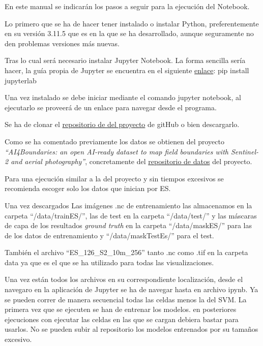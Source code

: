 En este manual se indicarán los pasos a seguir para la ejecución del Notebook.

Lo primero que se ha de hacer tener instalado o instalar Python, preferentemente en su versión 3.11.5 que es en la que se ha desarrollado, aunque seguramente no den problemas versiones más nuevas.

Tras lo cual será necesario instalar Jupyter Notebook. La forma sencilla sería hacer, la guía propia de Jupyter se encuentra en el siguiente \href{https://jupyter.org/install}{enlace}:
pip install jupyterlab

Una vez instalado se debe iniciar mediante el comando jupyter notebook, al ejecutarlo se proveerá de un enlace para navegar desde el programa. 

Se ha de clonar el \href{https://github.com/wgm1001/Trabajo_fin_master_deteccion_bordes}{repositorio de del proyecto} de gitHub o bien descargarlo.

Como se ha comentado previamente los datos se obtienen del proyecto \textit{``AI4Boundaries: an open AI-ready dataset to map field boundaries with Sentinel-2 and aerial photography''}\cite{AI4boundaries}, concretamente del  \href{https://jeodpp.jrc.ec.europa.eu/ftp/jrc-opendata/DRLsL/AI4BOUNDARIES/}{repositorio de datos} del proyecto.

Para una ejecución similar a la del proyecto y sin tiempos excesivos se recomienda escoger solo los datos que inician por ES.

Una vez descargados Las imágenes .nc de entrenamiento las almacenamos en la carpeta ``/data/trainES/'', las de test en la carpeta ``/data/test/'' y las máscaras de capa de los resultados \textit{ground truth} en la carpeta ``/data/maskES/'' para las de los datos de entrenamiento y ``/data/maskTestEs/'' para el test.

También el archivo ``ES\_126\_S2\_10m\_256'' tanto .nc como .tif en la carpeta data ya que es el que se ha utilizado para todas las visualizaciones.

Una vez están todos los archivos en su correspondiente localización, desde el navegaro en la aplicación de Jupyter se ha de navegar hasta en archivo ipynb. Ya se pueden correr de manera secuencial todas las celdas menos la del SVM. La primera vez que se ejecuten se han de entrenar los modelos. en posteriores ejecuciones con ejecutar las celdas en las que se cargan debiera bastar para usarlos. No se pueden subir al repositorio los modelos entrenados  por su tamaños excesivo.